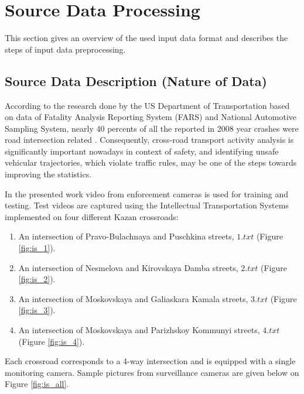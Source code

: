 \section{Source Data Processing}

This section gives an overview of the used input data format and describes the steps of input data preprocessing.

\subsection{Source Data Description (Nature of Data)}

According to the research done by the US Department of Transportation based on data of Fatality Analysis Reporting System (FARS) and National Automotive Sampling System, nearly 40 percents of all the reported in 2008 year crashes were road intersection related \cite{inproceedings:10_cfi}. Consequently, cross-road transport activity analysis is significantly important nowadays in context of safety, and identifying unsafe vehicular trajectories, which violate traffic rules, may be one of the steps towards improving the statistics.

In the presented work video from enforcement cameras is used for training and testing. Test videos are captured using the Intellectual Transportation Systems implemented on four different Kazan crossroads:

\begin{enumerate}
	\setlength\itemsep{0em}	
	\item An intersection of Pravo-Bulachnaya and Puschkina streets, $1.txt$ (Figure \ref{fig:is_1}).
	\item An intersection of Nesmelova and Kirovskaya Damba streets, $2.txt$ (Figure \ref{fig:is_2}).
	\item An intersection of Moskovskaya and Galiaskara Kamala streets, $3.txt$ (Figure \ref{fig:is_3}).
	\item An intersection of Moskovskaya and Parizhskoy Kommunyi streets, $4.txt$ (Figure \ref{fig:is_4}).
\end{enumerate}

Each crossroad corresponds to a 4-way intersection and is equipped with a single monitoring camera. Sample pictures from surveillance cameras are given below on Figure \ref{fig:is_all}.

